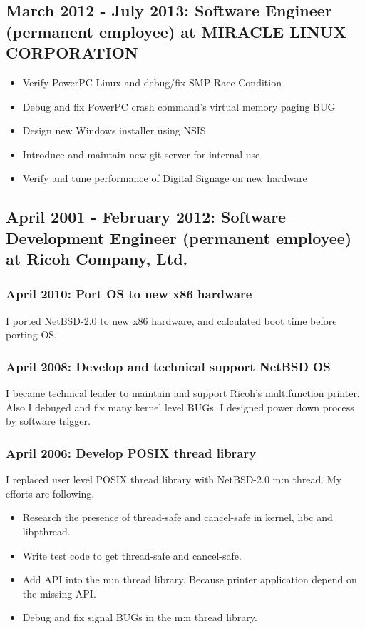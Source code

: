 \documentclass[letterpaper]{article}
\begin{document}
\subsection*{March 2012 - July 2013: Software Engineer (permanent employee) at MIRACLE LINUX CORPORATION}

\begin{itemize}
  \item Verify PowerPC Linux and debug/fix SMP Race Condition
  \item Debug and fix PowerPC crash command's virtual memory paging BUG
  \item Design new Windows installer using NSIS
  \item Introduce and maintain new git server for internal use
  \item Verify and tune performance of Digital Signage on new hardware
\end{itemize}

\subsection*{April 2001 - February 2012: Software Development Engineer (permanent employee) at Ricoh Company, Ltd.}
\subsubsection*{April 2010: Port OS to new x86 hardware}
I ported NetBSD-2.0 to new x86 hardware, and calculated boot time before porting OS.

\subsubsection*{April 2008: Develop and technical support NetBSD OS}
I became technical leader to maintain and support Ricoh's multifunction printer.
Also I debuged and fix many kernel level BUGs.
I designed power down process by software trigger.

\subsubsection*{April 2006: Develop POSIX thread library}
I replaced user level POSIX thread library with NetBSD-2.0 m:n thread.
My efforts are following.
\begin{itemize}
  \item Research the presence of thread-safe and cancel-safe in kernel, libc and libpthread.
  \item Write test code to get thread-safe and cancel-safe.
  \item Add API into the m:n thread library. Because printer application depend on the missing API.
  \item Debug and fix signal BUGs in the m:n thread library.
\end{itemize}
\end{document}
